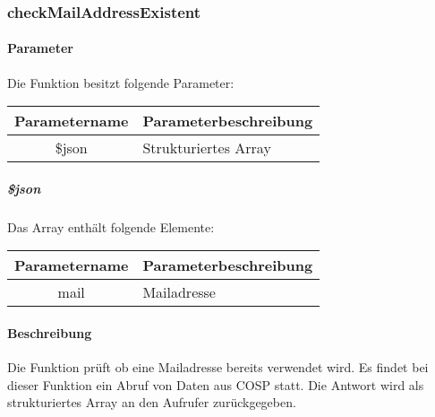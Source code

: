 \subsubsection{checkMailAddressExistent}
\paragraph{Parameter} Die Funktion besitzt folgende Parameter:
\begin{table}[H]
	\begin{tabular}{|c|p{11cm}|}
		\hline
		\textbf{Parametername} & \textbf{Parameterbeschreibung} \\ \hline
		\$json & Strukturiertes Array \\ \hline
	\end{tabular}
\end{table}
\subparagraph{\$json}Das Array enthält folgende Elemente:
\begin{table}[H]
	\begin{tabular}{|c|p{11cm}|}
		\hline
		\textbf{Parametername} & \textbf{Parameterbeschreibung} \\ \hline
		mail & Mailadresse \\ \hline
	\end{tabular}
\end{table}
\paragraph{Beschreibung} Die Funktion prüft ob eine Mailadresse bereits verwendet wird.
Es findet bei dieser Funktion ein Abruf von Daten aus {\glqq COSP\grqq} statt. Die Antwort wird als strukturiertes Array an den Aufrufer zurückgegeben.